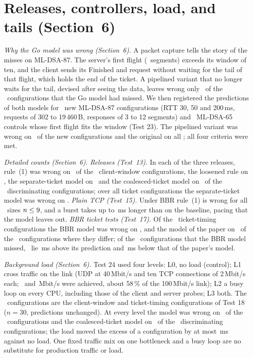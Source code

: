 \documentclass[9pt]{article}
\newcommand{\ms}{\,ms\xspace}
\begin{document}
\section*{Releases, controllers, load, and tails (Section~6)}
\emph{Why the Go model was wrong (Section~6).} A packet capture tells the story of the misses on ML-DSA-87. The server's first flight (\GoSrvMlEightSeven\ segments) exceeds its window of ten, and the client sends its Finished and request without waiting for the tail of that flight, which holds the end of the ticket. A pipelined variant that no longer waits for the tail, devised after seeing the data, leaves wrong only \GoPostAfter\ of the \GoPostBefore\ configurations that the Go model had missed. We then registered the predictions of both models for \GeighteenN\ new ML-DSA-87 configurations (RTT 30, 50 and 200\,ms, requests of 302 to 19\,460\,B, responses of 3 to 12 segments) and \GeighteenCtlN\ ML-DSA-65 controls whose first flight fits the window (Test 23). The pipelined variant was wrong on \GeighteenWrongPip\ of the new configurations and the original on all \GeighteenWrongGo; all four criteria were met.

\emph{Detailed counts (Section~6).} \emph{Releases (Test~13).} In each of the three releases, rule~(1) was wrong on \GxFourCWrong\ of the \CN\ client-window configurations, the loosened rule on \GxFourCLoose, the separate-ticket model on \GxFourDisEarly\ and the coalesced-ticket model on \GxFourDisJoined\ of the \DDiff\ discriminating configurations; over all ticket configurations the separate-ticket model was wrong on \GxFourEarlyWrong. \emph{Plain TCP (Test~15).} Under BBR rule~(1) is wrong for all \GelBbrWrongW\ sizes $n\le9$, and a burst takes up to \GelBbrBurstMax\ms longer than on the baseline, pacing that the model leaves out. \emph{BBR ticket tests (Test~17).} Of the \GfBbrDN\ ticket-timing configurations the BBR model was wrong on \GfBbrDWrong, and the model of the paper on \GfBbrRenoWrong\ of the \GfBbrDDiff\ configurations where they differ; of the \GfBbrDWrong\ configurations that the BBR model missed, \GfMidNW\ lie \GfMidAbove\ms above its prediction and \GfMidBelow\ms below that of the paper's model.

\emph{Background load (Section~6).} Test 24 used four levels: L0, no load (control); L1 cross traffic on the link (UDP at 40\,Mbit/s and ten TCP connections of 2\,Mbit/s each; \GseventeenUdp\ and \GseventeenTcp\,Mbit/s were achieved, about 58\,\% of the 100\,Mbit/s link); L2 a busy loop on every CPU, including those of the client and server probes; L3 both. The \GseventeenCells\ configurations are the client-window and ticket-timing configurations of Test 18 ($n=30$, predictions unchanged). At every level the model was wrong on \GseventeenWrongMax\ of the \GseventeenCells\ configurations and the coalesced-ticket model on \GseventeenJoinedMin\ of the \GseventeenDisc\ discriminating configurations; the load moved the excess of a configuration by at most \GseventeenShiftMax\,ms against no load. One fixed traffic mix on one bottleneck and a busy loop are no substitute for production traffic or load.
\end{document}
